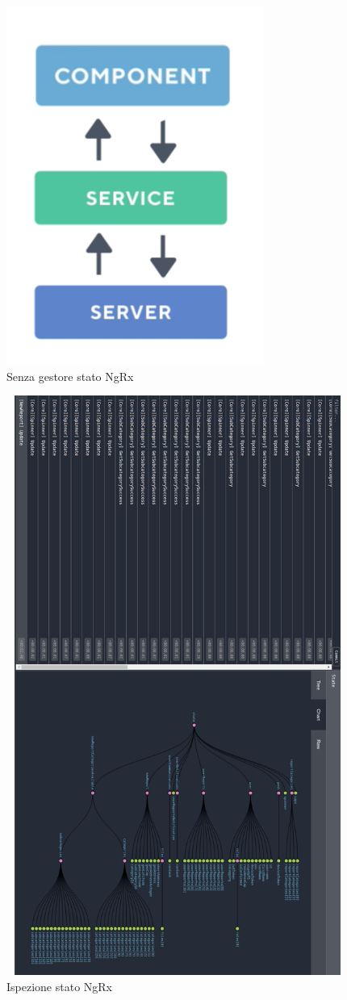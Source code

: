 \begin{figure}[h!]
    \centering  
    \caption{Senza gestore stato NgRx}
    \includegraphics[scale=0.5]{img/cap2/without-ngrx}
\end{figure}

\begin{figure}[!htb]
    \centering  
    \caption{Ispezione stato NgRx}
    \includegraphics[width=130mm,height=190mm]{img/cap2/ngrx-eservant-90-3}
\end{figure}
